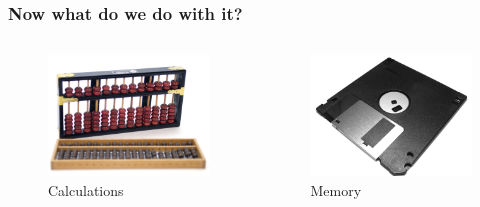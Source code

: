 \documentclass{beamer}
\begin{document}
\begin{frame}\frametitle{Now what do we do with it?}
  \begin{columns}
  \begin{column}{6cm}
  \begin{figure}
  \includegraphics[width=1\textwidth]{abakus}
  \caption{Calculations}
  \end{figure}
  \end{column}
  \begin{column}{6cm}
  \begin{figure}
  \includegraphics[width=1\textwidth]{memory}
  \caption{Memory}
  \end{figure}
  \end{column}
  \end{columns}
\end{frame}
\end{document}
